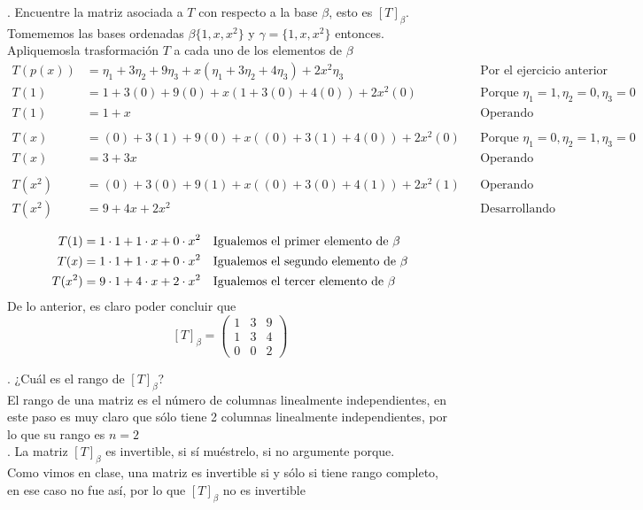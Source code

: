 \documentclass[letterpaper]{article}
\renewcommand{\*}{\cdot}
\theoremstyle{definition}
\begin{document}
. Encuentre la matriz asociada a $T$ con respecto a la base $\beta$, esto es $[T]_{\beta}$.
Tomememos las bases ordenadas $ \beta\{ 1,x,x^2 \} $ y $ \gamma = \{ 1, x, x^2 \} $ entonces. Apliquemosla trasformación $ T $ a cada uno de los elementos de $ \beta $
\begin{align*}
	 T(p(x)) &= \eta_1 + 3\eta_2 + 9\eta_3 + x(\eta_1 + 3 \eta_2 + 4 \eta_3) + 2 x^2\eta_3 && \text{Por el ejercicio anterior}\\
	 T(1) &= 1 + 3(0) + 9(0) + x(1 + 3 (0) + 4 (0)) + 2 x^2(0) && \text{Porque }\eta_1 = 1, \eta_2 = 0, \eta_3 = 0 \\
	 T(1) &= 1 + x && \text{Operando }\\
	 \\
	 T(x) &= (0) + 3(1) + 9(0) + x((0) + 3 (1) + 4 (0)) + 2 x^2(0) && \text{Porque }\eta_1 = 0, \eta_2 = 1, \eta_3 = 0 \\
	 T(x) &= 3 + 3x && \text{Operando }\\
	 \\
	 T(x^2) &= (0) + 3(0) + 9(1) + x((0) + 3 (0) + 4 (1)) + 2 x^2(1) && \text{Operando }\\
	 T(x^2) &= 9+ 4x + 2x^2 && \text{Desarrollando }\\
\end{align*}
\begin{align*}
	T(1) &= 1\* 1 + 1\*x + 0\*x^2 && \text{Igualemos el primer elemento de $ \beta $}\\
	T(x) &=1\* 1 + 1\*x + 0\*x^2 && \text{Igualemos el segundo elemento de $ \beta $}\\
	T(x^2) &= 9\* 1 + 4\*x + 2\*x^2 && \text{Igualemos el tercer elemento de $ \beta $}\\
\end{align*}
De lo anterior, es claro poder concluir que 
\[ [T]_{\beta} = \begin{pmatrix}
	1 & 3 & 9 \\
	1 & 3 & 4 \\
	0 & 0 & 2 
\end{pmatrix} \]



. ¿Cuál es el rango de $[T]_{\beta}$?\\
El rango de una matriz es el número de columnas linealmente independientes, en este paso es muy claro que sólo tiene 2 columnas linealmente independientes, por lo que su rango es $ n = 2 $\\


. La matriz $[T]_{\beta}$ es invertible, si sí muéstrelo, si no argumente porque.\\
Como vimos en clase, una matriz es invertible si y sólo si tiene rango completo, en ese caso no fue así, por lo que $ [T]_{\beta} $ no es invertible\\
\end{document}
